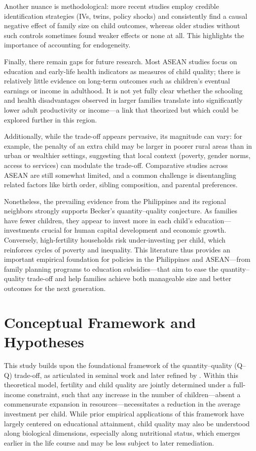 \documentclass[]{AEA}
\begin{document}
Another nuance is methodological: more recent studies employ credible
identification strategies (IVs, twins, policy shocks) and consistently
find a causal negative effect of family size on child outcomes, whereas
older studies without such controls sometimes found weaker effects or
none at all. This highlights the importance of accounting for
endogeneity.

Finally, there remain gaps for future research. Most ASEAN studies focus
on education and early-life health indicators as measures of child
quality; there is relatively little evidence on long-term outcomes such
as children's eventual earnings or income in adulthood. It is not yet
fully clear whether the schooling and health disadvantages observed in
larger families translate into significantly lower adult productivity or
income---a link that \citet{becker1976child} theorized but which could
be explored further in this region.

Additionally, while the trade-off appears pervasive, its magnitude can
vary: for example, the penalty of an extra child may be larger in poorer
rural areas than in urban or wealthier settings, suggesting that local
context (poverty, gender norms, access to services) can modulate the
trade-off. Comparative studies across ASEAN are still somewhat limited,
and a common challenge is disentangling related factors like birth
order, sibling composition, and parental preferences.

Nonetheless, the prevailing evidence from the Philippines and its
regional neighbors strongly supports Becker's quantity--quality
conjecture. As families have fewer children, they appear to invest more
in each child's education---investments crucial for human capital
development and economic growth. Conversely, high-fertility households
risk under-investing per child, which reinforces cycles of poverty and
inequality. This literature thus provides an important empirical
foundation for policies in the Philippines and ASEAN---from family
planning programs to education subsidies---that aim to ease the
quantity--quality trade-off and help families achieve both manageable
size and better outcomes for the next generation.

\section{Conceptual Framework and Hypotheses}

This study builds upon the foundational framework of the
quantity--quality (Q--Q) trade-off, as articulated in
\citet{becker1960economic} seminal work and later refined by
\citet{becker1973interaction}. Within this theoretical model, fertility
and child quality are jointly determined under a full-income constraint,
such that any increase in the number of children---absent a commensurate
expansion in resources---necessitates a reduction in the average
investment per child. While prior empirical applications of this
framework have largely centered on educational attainment, child quality
may also be understood along biological dimensions, especially along
nutritional status, which emerges earlier in the life course and may be
less subject to later remediation.
\end{document}
